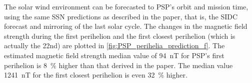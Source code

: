 The solar wind environment can be forecasted to PSP's orbit and mission time, using the same SSN predictions as described in the paper, that is, the SIDC forecast and mirroring of the last solar cycle. The changes in the magnetic field strength during the first perihelion and the first closest perihelion (which is actually the 22nd) are plotted in \autoref{fig:PSP_perihelia_prediction_f}. The estimated magnetic field strength median value of \SI{94}{\nano\tesla} for PSP's first perihelion is \SI{8}{\%} higher than that derived in the paper. The median value \SI{1241}{\nano\tesla} for the first closest perihelion is even \SI{32}{\%} higher.
\begin{figure}[htb]
\end{figure}

